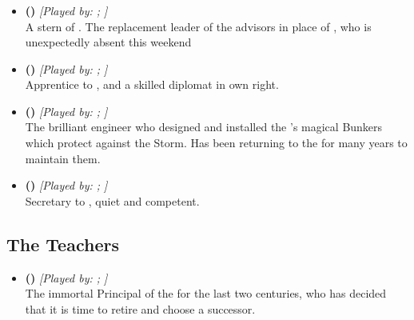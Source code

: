 \documentclass[blue]{GL2020}
\begin{document}
\subsubsection*{\pShip{}}
\begin{itemize}
	\item \textbf{\cEbbPriest{\full} (\cEbbPriest{\MYCharpronouns})} \textit{[Played by: \cEbbPriest{\MYplayer}; \cEbbPriest{\MYPlaypronouns}]}\\ A stern \cEbbPriest{\cleric} of \cEbb{}. The replacement leader of the \pShip{} advisors in place of \cHeadDiplomat{\full}, who is unexpectedly absent this weekend

	\item \textbf{\cJuniorStatesman{\full} (\cJuniorStatesman{\MYCharpronouns})} \textit{[Played by: \cJuniorStatesman{\MYplayer}; \cJuniorStatesman{\MYPlaypronouns}]}\\ Apprentice to \cHeadDiplomat{}, and a skilled diplomat in \cJuniorStatesman{\their} own right.
	
	\item \textbf{\cBunker{\full} (\cBunker{\MYCharpronouns})} \textit{[Played by: \cBunker{\MYplayer}; \cBunker{\MYPlaypronouns}]}\\ The brilliant engineer who designed and installed the \pSc{}'s magical Bunkers which protect against the Storm. Has been returning to the \pSc{} for many years to maintain them.
	
	\item \textbf{\cChupLeader{\full} (\cChupLeader{\MYCharpronouns})} \textit{[Played by: \cChupLeader{\MYplayer}; \cChupLeader{\MYPlaypronouns}]}\\ Secretary to \cHeadDiplomat{}, quiet and competent.

\end{itemize}

\subsection*{The Teachers}

\begin{itemize}
	\item \textbf{\cPrincipal{\full} (\cPrincipal{\MYCharpronouns})} \textit{[Played by: \cPrincipal{\MYplayer}; \cPrincipal{\MYPlaypronouns}]}\\ The immortal Principal of the \pSc{} for the last two centuries, who has decided that it is time to retire and choose a successor. 
\end{itemize}
\end{document}
